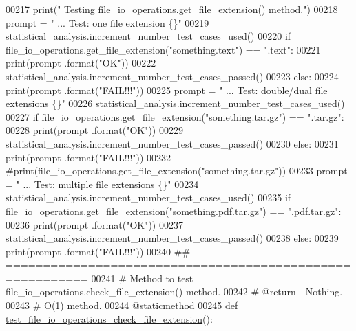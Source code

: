 \begin{DoxyCode}
00217         print(\textcolor{stringliteral}{" Testing file\_io\_operations.get\_file\_extension() method."})
00218         prompt = \textcolor{stringliteral}{"  ... Test: one file extension                \{\}"}
00219         statistical\_analysis.increment\_number\_test\_cases\_used()
00220         \textcolor{keywordflow}{if} file\_io\_operations.get\_file\_extension(\textcolor{stringliteral}{"something.text"}) == \textcolor{stringliteral}{".text"}:
00221             print(prompt .format(\textcolor{stringliteral}{"OK"}))
00222             statistical\_analysis.increment\_number\_test\_cases\_passed()
00223         \textcolor{keywordflow}{else}:
00224             print(prompt .format(\textcolor{stringliteral}{"FAIL!!!"}))
00225         prompt = \textcolor{stringliteral}{"  ... Test: double/dual file extensions           \{\}"}
00226         statistical\_analysis.increment\_number\_test\_cases\_used()
00227         \textcolor{keywordflow}{if} file\_io\_operations.get\_file\_extension(\textcolor{stringliteral}{"something.tar.gz"}) == \textcolor{stringliteral}{".tar.gz"}:
00228             print(prompt .format(\textcolor{stringliteral}{"OK"}))
00229             statistical\_analysis.increment\_number\_test\_cases\_passed()
00230         \textcolor{keywordflow}{else}:
00231             print(prompt .format(\textcolor{stringliteral}{"FAIL!!!"}))
00232             \textcolor{comment}{#print(file\_io\_operations.get\_file\_extension("something.tar.gz"))}
00233         prompt = \textcolor{stringliteral}{"  ... Test: multiple file extensions          \{\}"}
00234         statistical\_analysis.increment\_number\_test\_cases\_used()
00235         \textcolor{keywordflow}{if} file\_io\_operations.get\_file\_extension(\textcolor{stringliteral}{"something.pdf.tar.gz"}) == \textcolor{stringliteral}{".pdf.tar.gz"}:
00236             print(prompt .format(\textcolor{stringliteral}{"OK"}))
00237             statistical\_analysis.increment\_number\_test\_cases\_passed()
00238         \textcolor{keywordflow}{else}:
00239             print(prompt .format(\textcolor{stringliteral}{"FAIL!!!"}))
00240     \textcolor{comment}{## =========================================================}
00241     \textcolor{comment}{#   Method to test file\_io\_operations.check\_file\_extension() method.}
00242     \textcolor{comment}{#   @return - Nothing.}
00243     \textcolor{comment}{#   O(1) method.}
00244     @staticmethod
\hypertarget{file__io__tester_8py_source_l00245}{}\hyperlink{classutilities_1_1file__io__tester_1_1file__io__operations__tester_aeacc9602a024e8f2b6701b9305ffc930}{00245}     \textcolor{keyword}{def }\hyperlink{classutilities_1_1file__io__tester_1_1file__io__operations__tester_aeacc9602a024e8f2b6701b9305ffc930}{test\_file\_io\_operations\_check\_file\_extension}():

\end{DoxyCode}
